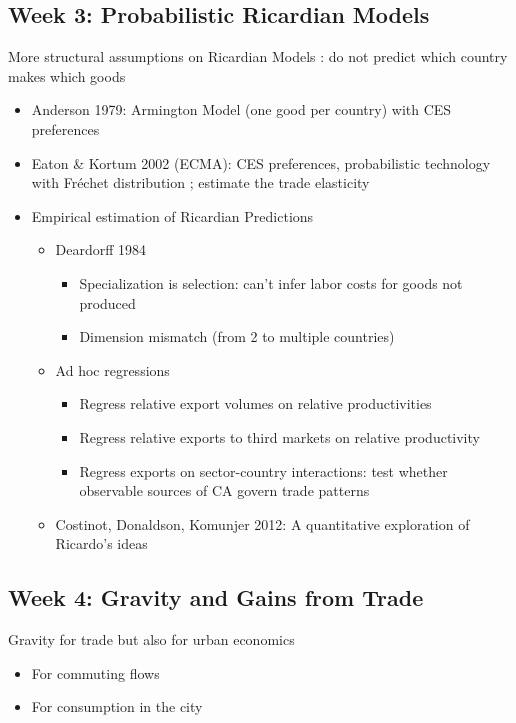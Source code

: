 \documentclass[12pt, final]{article}
\begin{document}
\subsection{Week 3: Probabilistic Ricardian Models} %
\label{sub:week_3_probabilistic_ricardian_models}

More structural assumptions on Ricardian Models : do not predict which country makes which goods
\begin{itemize}
    \item Anderson 1979: Armington Model (one good per country) with CES preferences
    \item Eaton \& Kortum 2002 (ECMA): CES preferences, probabilistic technology with Fréchet distribution ; estimate the trade elasticity
    \item Empirical estimation of Ricardian Predictions
    \begin{itemize}
        \item Deardorff 1984
        \begin{itemize}
            \item Specialization is selection: can't infer labor costs for goods not produced
            \item Dimension mismatch (from 2 to multiple countries)
        \end{itemize}
        \item Ad hoc regressions
        \begin{itemize}
            \item Regress relative export volumes on relative productivities
            \item Regress relative exports to third markets on relative productivity 
            \item Regress exports on sector-country interactions: test whether observable sources of CA govern trade patterns
        \end{itemize}
        \item Costinot, Donaldson, Komunjer 2012: A quantitative exploration of Ricardo's ideas
    \end{itemize}
\end{itemize}


\subsection{Week 4: Gravity and Gains from Trade} %
\label{sub:week_4_gravity_and_gains_from_trade}

Gravity for trade but also for urban economics
\begin{itemize}
    \item For commuting flows
    \item For consumption in the city
\end{itemize}
\end{document}
